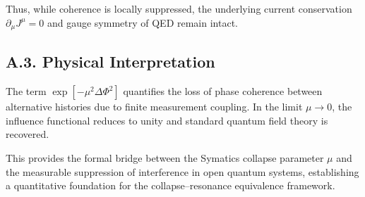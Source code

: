 \documentclass[12pt]{article}
\begin{document}
Thus, while coherence is locally suppressed,
the underlying current conservation
\(\partial_\mu J^\mu = 0\) and gauge symmetry of QED remain intact.

\subsection*{A.3. Physical Interpretation}

The term \(\exp[-\mu^2\Delta\Phi^2]\) quantifies the loss of
phase coherence between alternative histories due to finite
measurement coupling.  In the limit \(\mu \to 0\),
the influence functional reduces to unity and
standard quantum field theory is recovered.

This provides the formal bridge between the Symatics collapse
parameter \(\mu\) and the measurable suppression of interference
in open quantum systems, establishing a quantitative foundation
for the collapse--resonance equivalence framework.
\end{document}
